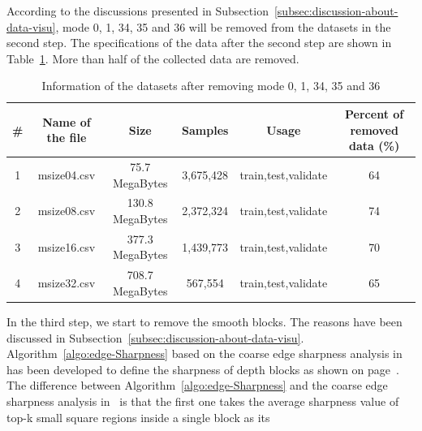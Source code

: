 According to the discussions presented in 
Subsection~\ref{subsec:discussion-about-data-visu},
mode 0, 1, 34, 35 and 36 will be removed from 
the datasets in the second step.
The specifications of the data after the second step
are shown in Table~\ref{tab:datasets-after-second-step}.
More than half of the collected data are removed.
\begin{table}[H]
    \caption{Information of the datasets after removing mode 0, 1, 34, 35 and 36}
    \bigskip\label{tab:datasets-after-second-step}
    \centering
    \begin{tabular}{c c c c c c}
        \toprule
        \# & Name of the file & Size & Samples & Usage & Percent of removed data (\%) \\
        \midrule
        1 & msize04.csv & 75.7 MegaBytes & 3,675,428 & train,test,validate & 64 \\
        2 & msize08.csv & 130.8 MegaBytes & 2,372,324 & train,test,validate & 74 \\
        3 & msize16.csv & 377.3 MegaBytes & 1,439,773 & train,test,validate & 70 \\
        4 & msize32.csv & 708.7 MegaBytes & 567,554 & train,test,validate & 65 \\
        \bottomrule
    \end{tabular}
\end{table}
In the third step, we start to remove the smooth blocks.
The reasons have been discussed in 
Subsection~\ref{subsec:discussion-about-data-visu}.
Algorithm~\ref{algo:edge-Sharpness}
based on the coarse edge sharpness analysis
in~\parencite{RN78} has been developed to define the
sharpness of depth blocks as shown 
on page~\pageref{algo:edge-Sharpness}.
The difference between Algorithm~\ref{algo:edge-Sharpness}
and the coarse edge sharpness analysis in~\parencite{RN78}
is that the first one takes the average sharpness value
of top-k small square regions inside a single block as its

